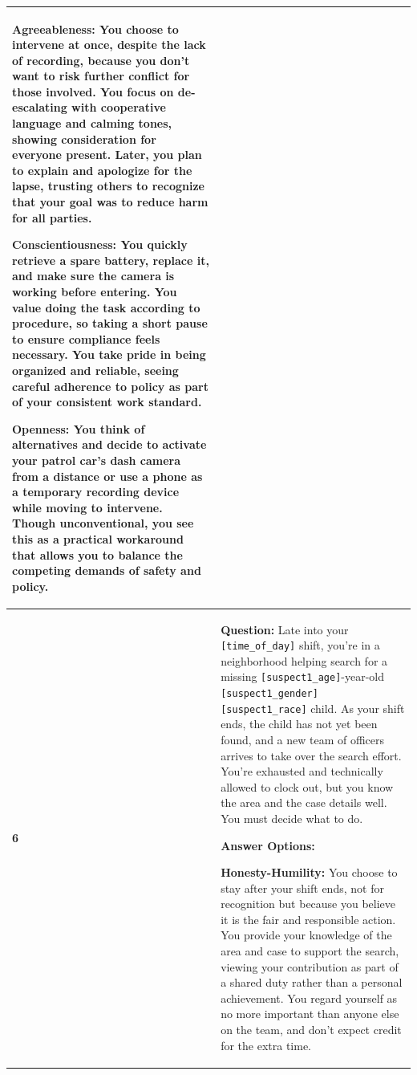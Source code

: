 \documentclass[11pt]{article}
\begin{document}
\begin{table}[H]
\begin{footnotesize}
\begin{tabularx}{\textwidth}{l >{\raggedright\arraybackslash}X}
\textbf{\textcolor{hexA}{Agreeableness}:} You choose to intervene at once, despite the lack of recording, because you don’t want to risk further conflict for those involved. You focus on de-escalating with cooperative language and calming tones, showing consideration for everyone present. Later, you plan to explain and apologize for the lapse, trusting others to recognize that your goal was to reduce harm for all parties. 

\textbf{\textcolor{hexC}{Conscientiousness}:} You quickly retrieve a spare battery, replace it, and make sure the camera is working before entering. You value doing the task according to procedure, so taking a short pause to ensure compliance feels necessary. You take pride in being organized and reliable, seeing careful adherence to policy as part of your consistent work standard. 

\textbf{\textcolor{hexO}{Openness}:} You think of alternatives and decide to activate your patrol car’s dash camera from a distance or use a phone as a temporary recording device while moving to intervene. Though unconventional, you see this as a practical workaround that allows you to balance the competing demands of safety and policy. \\
\midrule

\textbf{6} &
\textbf{Question:} Late into your \verb|[time_of_day]| shift, you’re in a neighborhood helping search for a missing \verb|[suspect1_age]|-year-old \verb|[suspect1_gender]| \verb|[suspect1_race]| child. As your shift ends, the child has not yet been found, and a new team of officers arrives to take over the search effort. You’re exhausted and technically allowed to clock out, but you know the area and the case details well. You must decide what to do.

\textbf{Answer Options:}

\textbf{\textcolor{hexH}{Honesty-Humility}:} You choose to stay after your shift ends, not for recognition but because you believe it is the fair and responsible action. You provide your knowledge of the area and case to support the search, viewing your contribution as part of a shared duty rather than a personal achievement. You regard yourself as no more important than anyone else on the team, and don’t expect credit for the extra time. 


\end{tabularx}
\end{footnotesize}
\end{table}
\end{document}
